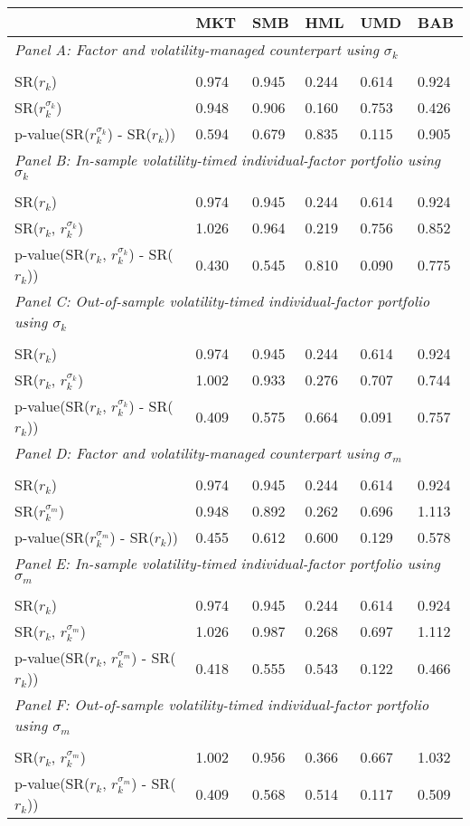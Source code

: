 \begin{tabular}{llllll}
\toprule
 & MKT & SMB & HML & UMD & BAB \\
\midrule
\multicolumn{7}{l}{\textit{Panel A: Factor and volatility-managed counterpart using $\sigma_k$}} \\ &  &  &  &  &  \\
SR($r_k$) & 0.974 & 0.945 & 0.244 & 0.614 & 0.924 \\
SR($r_k^{\sigma_k}$) & 0.948 & 0.906 & 0.160 & 0.753 & 0.426 \\
p-value(SR($r_k^{\sigma_k}$) - SR($r_k$)) & 0.594 & 0.679 & 0.835 & 0.115 & 0.905 \\
\multicolumn{7}{l}{\textit{Panel B: In-sample volatility-timed individual-factor portfolio using $\sigma_k$}} \\ &  &  &  &  &  \\
SR($r_k$) & 0.974 & 0.945 & 0.244 & 0.614 & 0.924 \\
SR($r_k$, $r_k^{\sigma_k}$) & 1.026 & 0.964 & 0.219 & 0.756 & 0.852 \\
p-value(SR($r_k$, $r_k^{\sigma_k}$) - SR($r_k$)) & 0.430 & 0.545 & 0.810 & 0.090 & 0.775 \\
\multicolumn{7}{l}{\textit{Panel C: Out-of-sample volatility-timed individual-factor portfolio using $\sigma_k$}} \\ &  &  &  &  &  \\
SR($r_k$) & 0.974 & 0.945 & 0.244 & 0.614 & 0.924 \\
SR($r_k$, $r_k^{\sigma_k}$) & 1.002 & 0.933 & 0.276 & 0.707 & 0.744 \\
p-value(SR($r_k$, $r_k^{\sigma_k}$) - SR($r_k$)) & 0.409 & 0.575 & 0.664 & 0.091 & 0.757 \\
\multicolumn{7}{l}{\textit{Panel D: Factor and volatility-managed counterpart using $\sigma_m$}} \\ &  &  &  &  &  \\
SR($r_k$) & 0.974 & 0.945 & 0.244 & 0.614 & 0.924 \\
SR($r_k^{\sigma_m}$) & 0.948 & 0.892 & 0.262 & 0.696 & 1.113 \\
p-value(SR($r_k^{\sigma_m}$) - SR($r_k$)) & 0.455 & 0.612 & 0.600 & 0.129 & 0.578 \\
\multicolumn{7}{l}{\textit{Panel E: In-sample volatility-timed individual-factor portfolio using $\sigma_m$}} \\ &  &  &  &  &  \\
SR($r_k$) & 0.974 & 0.945 & 0.244 & 0.614 & 0.924 \\
SR($r_k$, $r_k^{\sigma_m}$) & 1.026 & 0.987 & 0.268 & 0.697 & 1.112 \\
p-value(SR($r_k$, $r_k^{\sigma_m}$) - SR($r_k$)) & 0.418 & 0.555 & 0.543 & 0.122 & 0.466 \\
\multicolumn{7}{l}{\textit{Panel F: Out-of-sample volatility-timed individual-factor portfolio using $\sigma_m$}} \\ &  &  &  &  &  \\
SR($r_k$, $r_k^{\sigma_m}$) & 1.002 & 0.956 & 0.366 & 0.667 & 1.032 \\
p-value(SR($r_k$, $r_k^{\sigma_m}$) - SR($r_k$)) & 0.409 & 0.568 & 0.514 & 0.117 & 0.509 \\
\bottomrule
\end{tabular}
